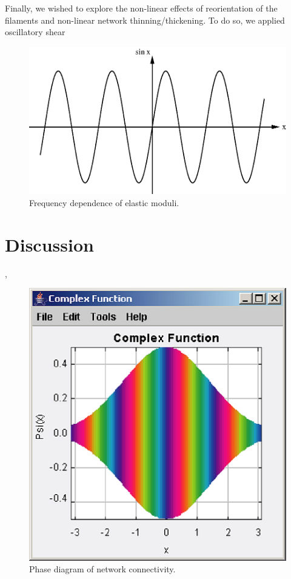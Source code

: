 \documentclass[pre,preprint]{revtex4-1}
\begin{document}
Finally, we wished to explore the non-linear effects of reorientation of the filaments and non-linear network thinning/thickening.  To do so, we applied oscillatory shear 

\begin{figure}[h!]
\centering
\includegraphics[scale=0.6]{sine}
\caption{\label{fig:freq}Frequency dependence of elastic moduli.}
\end{figure}




\section{Discussion}

{\color{blue}{Finally I wax philosophical}},
{\color{green}{but}} {\color{cyan}{who is going to pay for the ink?}}

\begin{figure}[h!]
\centering
\includegraphics[scale=0.6]{phase}
\caption{\label{fig:sim}Phase diagram of network connectivity.}
\end{figure}
\end{document}
